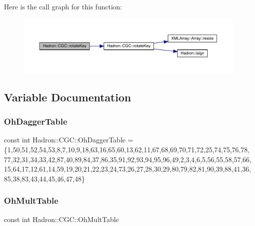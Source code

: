 Here is the call graph for this function\+:\nopagebreak
\begin{figure}[H]
\begin{center}
\leavevmode
\includegraphics[width=350pt]{d9/d19/namespaceHadron_1_1CGC_ad5f1f6f8b8dd82238f3efeb03d1dc6e5_cgraph}
\end{center}
\end{figure}


\subsection{Variable Documentation}
\mbox{\label{namespaceHadron_1_1CGC_a1eb370ef84af334291e2488ffea2c979}} 
\subsubsection{\texorpdfstring{OhDaggerTable}{OhDaggerTable}}
{\footnotesize\ttfamily const int Hadron\+::\+C\+G\+C\+::\+Oh\+Dagger\+Table = \{1,50,51,52,54,53,8,7,10,9,18,63,16,65,60,13,62,11,67,68,69,70,71,72,25,74,75,76,78,77,32,31,34,33,42,87,40,89,84,37,86,35,91,92,93,94,95,96,49,2,3,4,6,5,56,55,58,57,66,15,64,17,12,61,14,59,19,20,21,22,23,24,73,26,27,28,30,29,80,79,82,81,90,39,88,41,36,85,38,83,43,44,45,46,47,48\}}

\mbox{\label{namespaceHadron_1_1CGC_a1d8567cc768ec6fc24e3b51fbe4b024d}} 
\subsubsection{\texorpdfstring{OhMultTable}{OhMultTable}}
{\footnotesize\ttfamily const int Hadron\+::\+C\+G\+C\+::\+Oh\+Mult\+Table}


